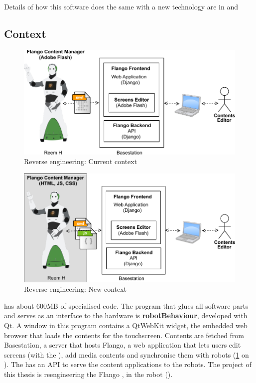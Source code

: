 Details of how this software does the same with a new technology are in  and 

\subsection{Context}
\label{sec:context}

\begin{figure}[htb]
    \centering
    \includegraphics{figures/context-original.pdf}
    \caption{Reverse engineering: Current context}
    \label{fig:context-original}
\end{figure}

\begin{figure}[htb]
    \centering
    \includegraphics{figures/context-new.pdf}
    \caption{Reverse engineering: New context}
    \label{fig:context-new}
\end{figure}

 has about 600MB of specialised code.
The program that glues all software parts and serves as an interface to the hardware is \textbf{robotBehaviour}, developed with Qt.
A window in this program contains a QtWebKit widget, the embedded web browser that loads the contents for the touchscreen.
Contents are fetched from Basestation, a server that hosts Flango, a web application that lets users edit screens (with the \se), add media contents and synchronise them with robots (\ref{fig:context-original} on \pageref{fig:context-original}).
The \flangobe has an \ac{API} to serve the content applications to the robots.
The project of this thesis is reengineering the Flango \cm , in the robot ().

